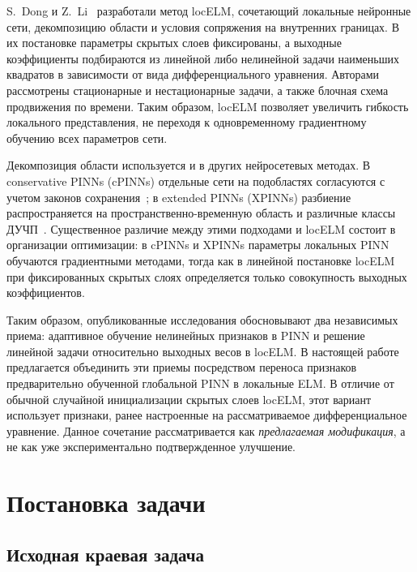 \documentclass{misisarticle}
\begin{document}
S.~Dong и Z.~Li~\cite{dongli2021} разработали метод locELM, сочетающий локальные нейронные сети, декомпозицию области и условия сопряжения на внутренних границах. В их постановке параметры скрытых слоев фиксированы, а выходные коэффициенты подбираются из линейной либо нелинейной задачи наименьших квадратов в зависимости от вида дифференциального уравнения. Авторами рассмотрены стационарные и нестационарные задачи, а также блочная схема продвижения по времени. Таким образом, locELM позволяет увеличить гибкость локального представления, не переходя к одновременному градиентному обучению всех параметров сети.

Декомпозиция области используется и в других нейросетевых методах. В conservative PINNs (cPINNs) отдельные сети на подобластях согласуются с учетом законов сохранения~\cite{jagtap2020cpinn}; в extended PINNs (XPINNs) разбиение распространяется на пространственно-временную область и различные классы ДУЧП~\cite{jagtap2020xpinn}. Существенное различие между этими подходами и locELM состоит в организации оптимизации: в cPINNs и XPINNs параметры локальных PINN обучаются градиентными методами, тогда как в линейной постановке locELM при фиксированных скрытых слоях определяется только совокупность выходных коэффициентов.

Таким образом, опубликованные исследования обосновывают два независимых приема: адаптивное обучение нелинейных признаков в PINN и решение линейной задачи относительно выходных весов в locELM. В настоящей работе предлагается объединить эти приемы посредством переноса признаков предварительно обученной глобальной PINN в локальные ELM. В отличие от обычной случайной инициализации скрытых слоев locELM, этот вариант использует признаки, ранее настроенные на рассматриваемое дифференциальное уравнение. Данное сочетание рассматривается как \textit{предлагаемая модификация}, а не как уже экспериментально подтвержденное улучшение.

\section{Постановка задачи}

\subsection{Исходная краевая задача}
\end{document}
